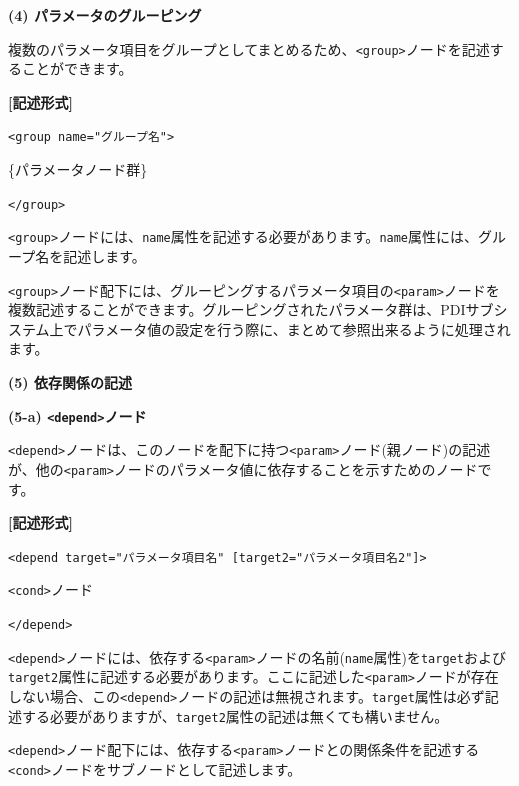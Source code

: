 \documentclass[a4paper,11pt]{jarticle}
\begin{document}
{\vspace{12pt}
\textbf{(4) パラメータのグルーピング}

複数のパラメータ項目をグループとしてまとめるため、\texttt{<group>}ノードを記述することができます。

\vspace{8pt}
\leftskip=12pt
\textbf{[記述形式]}

\leftskip=42pt
\texttt{<group name="グループ名">}    

\parindent=14pt
\{パラメータノード群\}

\parindent=0pt
\texttt{</group>}

\vspace{8pt}
\leftskip=0pt
\texttt{<group>}ノードには、{\tt name}属性を記述する必要があります。{\tt name}属性には、グループ名を記述します。

\vspace{12pt}
\texttt{<group>}ノード配下には、グルーピングするパラメータ項目の\texttt{<param>}ノードを複数記述することができます。グルーピングされたパラメータ群は、PDIサブシステム上でパラメータ値の設定を行う際に、まとめて参照出来るように処理されます。

\vspace{12pt}
\textbf{(5) 依存関係の記述}

\vspace{12pt}
\textbf{(5-a) \texttt{<depend>}ノード}

\texttt{<depend>}ノードは、このノードを配下に持つ\texttt{<param>}ノード(親ノード)の記述が、他の\texttt{<param>}ノードのパラメータ値に依存することを示すためのノードです。

\vspace{8pt}
\leftskip=12pt
\textbf{[記述形式]}

\leftskip=42pt
\texttt{<depend target="パラメータ項目名" [target2="パラメータ項目名2"]>} 
   

\parindent=14pt
\texttt{<cond>}ノード

\parindent=0pt
\texttt{</depend>}

\vspace{8pt}
\leftskip=0pt
\texttt{<depend>}ノードには、依存する\texttt{<param>}ノードの名前({\tt name}属性)を\texttt{target}および\texttt{target2}属性に記述する必要があります。ここに記述した\texttt{<param>}ノードが存在しない場合、この\texttt{<depend>}ノードの記述は無視されます。\texttt{target}属性は必ず記述する必要がありますが、\texttt{target2}属性の記述は無くても構いません。

\texttt{<depend>}ノード配下には、依存する\texttt{<param>}ノードとの関係条件を記述する\texttt{<cond>}ノードをサブノードとして記述します。

}
\end{document}
